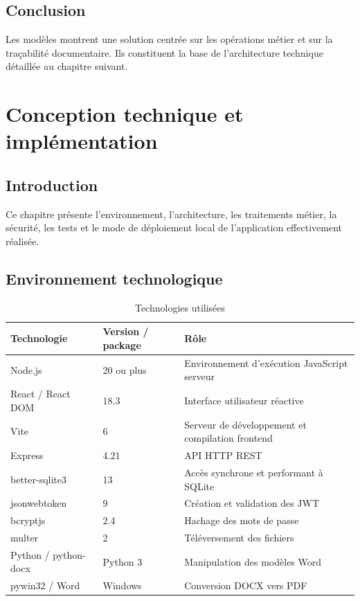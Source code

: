 \documentclass[12pt,a4paper,oneside]{report}
\begin{document}
\section*{Conclusion}
Les modèles montrent une solution centrée sur les opérations métier et sur la traçabilité documentaire. Ils constituent la base de l'architecture technique détaillée au chapitre suivant.

\chapter{Conception technique et implémentation}
\section*{Introduction}
Ce chapitre présente l'environnement, l'architecture, les traitements métier, la sécurité, les tests et le mode de déploiement local de l'application effectivement réalisée.

\section{Environnement technologique}
\begin{table}[H]\centering
\caption{Technologies utilisées}
\begin{tabularx}{\textwidth}{p{3.5cm}p{3cm}Y}
\toprule \textbf{Technologie} & \textbf{Version / package} & \textbf{Rôle}\\ \midrule
Node.js & 20 ou plus & Environnement d'exécution JavaScript serveur\\
React / React DOM & 18.3 & Interface utilisateur réactive\\
Vite & 6 & Serveur de développement et compilation frontend\\
Express & 4.21 & API HTTP REST\\
better-sqlite3 & 13 & Accès synchrone et performant à SQLite\\
jsonwebtoken & 9 & Création et validation des JWT\\
bcryptjs & 2.4 & Hachage des mots de passe\\
multer & 2 & Téléversement des fichiers\\
Python / python-docx & Python 3 & Manipulation des modèles Word\\
pywin32 / Word & Windows & Conversion DOCX vers PDF\\
\bottomrule
\end{tabularx}
\end{table}
\end{document}

